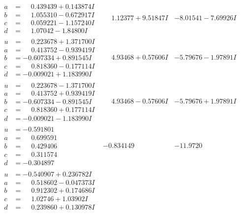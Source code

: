 \documentclass[1p]{elsarticle_modified}
\theoremstyle{definition}
\begin{document}
$$\begin{array}{c|c|c}
\begin{aligned}
a &= \phantom{-}0.439439 + 0.143874 I \\
b &= \phantom{-}1.055310 - 0.672917 I \\
c &= \phantom{-}0.059221 - 1.157240 I \\
d &= \phantom{-}1.07042 - 1.84800 I\end{aligned}
 & \phantom{-}1.12377 + 9.51847 I & -8.01541 - 7.69926 I \\ \hline\begin{aligned}
u &= \phantom{-}0.223678 + 1.371700 I \\
a &= \phantom{-}0.413752 - 0.939419 I \\
b &= -0.607334 + 0.891545 I \\
c &= \phantom{-}0.818360 - 0.177114 I \\
d &= -0.009021 + 1.183990 I\end{aligned}
 & \phantom{-}4.93468 + 0.57606 I & -5.79676 - 1.97891 I \\ \hline\begin{aligned}
u &= \phantom{-}0.223678 - 1.371700 I \\
a &= \phantom{-}0.413752 + 0.939419 I \\
b &= -0.607334 - 0.891545 I \\
c &= \phantom{-}0.818360 + 0.177114 I \\
d &= -0.009021 - 1.183990 I\end{aligned}
 & \phantom{-}4.93468 - 0.57606 I & -5.79676 + 1.97891 I \\ \hline\begin{aligned}
u &= -0.591801\phantom{ +0.000000I} \\
a &= \phantom{-}0.699591\phantom{ +0.000000I} \\
b &= \phantom{-}0.429406\phantom{ +0.000000I} \\
c &= \phantom{-}0.311574\phantom{ +0.000000I} \\
d &= -0.304897\phantom{ +0.000000I}\end{aligned}
 & -0.834149\phantom{ +0.000000I} & -11.9720\phantom{ +0.000000I} \\ \hline\begin{aligned}
u &= -0.540907 + 0.236782 I \\
a &= \phantom{-}0.518602 - 0.047373 I \\
b &= \phantom{-}0.912302 + 0.174686 I \\
c &= \phantom{-}1.02746 + 1.03902 I \\
d &= \phantom{-}0.239860 + 0.130978 I\end{aligned}

\end{array}$$
\end{document}
